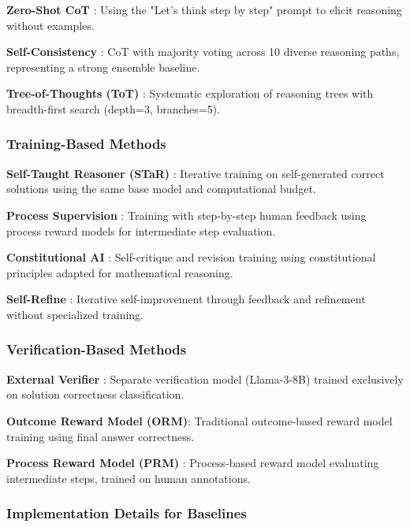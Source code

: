 \documentclass[10pt,twocolumn]{article}
\begin{document}
\textbf{Zero-Shot CoT} \cite{kojima2022large}: Using the "Let's think step by step" prompt to elicit reasoning without examples.

\textbf{Self-Consistency} \cite{wang2022self}: CoT with majority voting across 10 diverse reasoning paths, representing a strong ensemble baseline.

\textbf{Tree-of-Thoughts (ToT)} \cite{yao2023tree}: Systematic exploration of reasoning trees with breadth-first search (depth=3, branches=5).

\subsubsection{Training-Based Methods}

\textbf{Self-Taught Reasoner (STaR)} \cite{zelikman2022star}: Iterative training on self-generated correct solutions using the same base model and computational budget.

\textbf{Process Supervision} \cite{lightman2023lets}: Training with step-by-step human feedback using process reward models for intermediate step evaluation.

\textbf{Constitutional AI} \cite{bai2022constitutional}: Self-critique and revision training using constitutional principles adapted for mathematical reasoning.

\textbf{Self-Refine} \cite{madaan2023self}: Iterative self-improvement through feedback and refinement without specialized training.

\subsubsection{Verification-Based Methods}

\textbf{External Verifier} \cite{cobbe2021training}: Separate verification model (Llama-3-8B) trained exclusively on solution correctness classification.

\textbf{Outcome Reward Model (ORM)}: Traditional outcome-based reward model training using final answer correctness.

\textbf{Process Reward Model (PRM)} \cite{lightman2023lets}: Process-based reward model evaluating intermediate steps, trained on human annotations.

\subsubsection{Implementation Details for Baselines}
\end{document}
